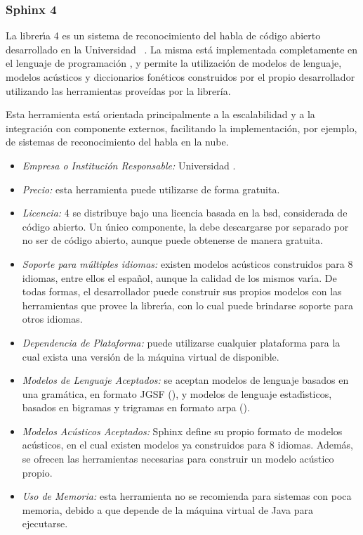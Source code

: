 \subsubsection{Sphinx 4}
\label{sec:sphinx}

La librer{\'\i}a  4 es un sistema de reconocimiento del habla de c\'odigo 
abierto desarrollado en
la Universidad \mbox{ \cite{Sphinx4}}. La misma est\'a implementada
completamente en el lenguaje de programaci\'on , y permite la utilizaci\'on de modelos 
de lenguaje,
modelos ac\'usticos y diccionarios fon\'eticos construidos por el propio desarrollador utilizando las
herramientas proveídas por la librer\'ia.

Esta herramienta est\'a orientada principalmente a la escalabilidad y a la integraci\'on con
componente externos, facilitando la implementaci\'on, por ejemplo, de sistemas de reconocimiento del
habla en la nube.

\begin{itemize}
	\item \emph{Empresa o Instituci\'on Responsable:} Universidad .
	\item \emph{Precio:} esta herramienta puede utilizarse de forma gratuita.
	\item \emph{Licencia:}  4 se distribuye bajo una licencia basada en la \gls{bsd},
	considerada
	de c\'odigo abierto. Un \'unico componente, la  debe descargarse por
	separado por no ser de c\'odigo abierto, aunque puede obtenerse de manera gratuita.
	\item \emph{Soporte para m\'ultiples idiomas:} existen modelos ac\'usticos construidos para
	8 idiomas, entre ellos el espa\~nol, aunque la calidad de los mismos var{\'\i}a.
	De todas formas, el desarrollador puede construir sus propios modelos con las herramientas
	que provee la librer{\'\i}a, con lo cual puede brindarse soporte para otros idiomas.
	\item \emph{Dependencia de Plataforma:} puede utilizarse cualquier plataforma para la cual
	exista una versi\'on de la m\'aquina virtual de  disponible.
	\item \emph{Modelos de Lenguaje Aceptados:} se aceptan modelos de lenguaje basados en una
        gram\'atica, en formato JGSF (), y modelos de 
        lenguaje estad{\'\i}sticos, basados en bigramas y trigramas en formato \gls{arpa} ().
	\item \emph{Modelos Ac\'usticos Aceptados:} Sphinx define su propio formato de modelos ac\'usticos,
	en el cual existen modelos ya construidos para 8 idiomas. Adem\'as, se ofrecen las herramientas
	necesarias para construir un modelo ac\'ustico propio.
	\item \emph{Uso de Memoria:} esta herramienta no se recomienda para sistemas con poca memoria,
	debido a que depende de la m\'aquina virtual de Java para ejecutarse.
\end{itemize}

